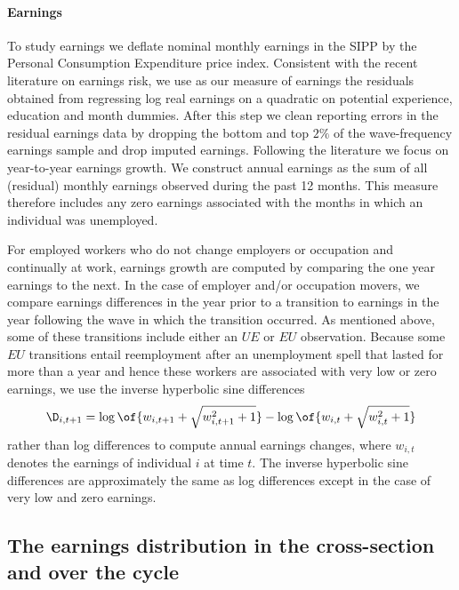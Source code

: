 \documentclass[12pt]{article}
\theoremstyle{definition}
\begin{document}
\paragraph{Earnings} To study earnings we deflate nominal monthly earnings in the SIPP by the Personal Consumption Expenditure price index. Consistent with the recent literature on earnings risk, we use as  our measure of earnings the residuals obtained from regressing log real earnings on a quadratic on potential experience, education and month dummies. After this step we clean reporting errors in the residual earnings data by dropping the bottom and top $2\%$ of the wave-frequency earnings sample and drop imputed earnings. Following the literature we focus on year-to-year earnings growth. We construct annual earnings as the sum of all (residual) monthly earnings observed during the past 12 months. This measure therefore includes any zero earnings associated with the months in which an individual was unemployed. 

For employed workers who do not change employers or occupation and continually at work, earnings growth are computed by comparing the one year earnings to the next. In the case of employer and/or occupation movers, we compare earnings differences in the year prior to a transition to earnings in the year following the wave in which the transition occurred. As mentioned above, some of these transitions include either an $UE$ or $EU$ observation. Because some $EU$ transitions entail reemployment after an unemployment spell that lasted for more than a year and hence these workers are associated with very low or zero earnings, we use the inverse hyperbolic sine differences 
$$
\D_{i, t+1} = \log\of{w_{i, t+1} + \sqrt{w_{i,t+1}^2 + 1}} - \log\of{w_{i, t} + \sqrt{w_{i,t}^2 + 1}}
$$
rather than log differences to compute annual earnings changes, where $w_{i,t}$ denotes the earnings of individual $i$ at time $t$. The inverse hyperbolic sine differences are approximately the same as log differences except in the case of very low and zero  earnings.

\subsection{The earnings distribution in the cross-section and over the cycle}
\end{document}
